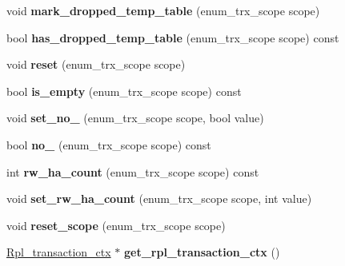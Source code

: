 \begin{DoxyCompactItemize}
\mbox{\label{classTransaction__ctx_aea4e08f7bcf5c692fd1ff96224eb10de}} 
void {\bfseries mark\+\_\+dropped\+\_\+temp\+\_\+table} (enum\+\_\+trx\+\_\+scope scope)
\item 
\mbox{\label{classTransaction__ctx_ad8d99dfe933f82d8cab74578e6116664}} 
bool {\bfseries has\+\_\+dropped\+\_\+temp\+\_\+table} (enum\+\_\+trx\+\_\+scope scope) const
\item 
\mbox{\label{classTransaction__ctx_a6dcc4e14c30441acb00bfe4e3ee8d58e}} 
void {\bfseries reset} (enum\+\_\+trx\+\_\+scope scope)
\item 
\mbox{\label{classTransaction__ctx_afa159d305acb12b115ec7c913e0c4211}} 
bool {\bfseries is\+\_\+empty} (enum\+\_\+trx\+\_\+scope scope) const
\item 
\mbox{\label{classTransaction__ctx_ad749bc2fe6f27acff04ec5912609898c}} 
void {\bfseries set\+\_\+no\+\_\+2pc} (enum\+\_\+trx\+\_\+scope scope, bool value)
\item 
\mbox{\label{classTransaction__ctx_a3aecf3a683f8290238181bbd18d8bf3d}} 
bool {\bfseries no\+\_\+2pc} (enum\+\_\+trx\+\_\+scope scope) const
\item 
\mbox{\label{classTransaction__ctx_a7a644bf071672433e0e0b7ccd285ae2a}} 
int {\bfseries rw\+\_\+ha\+\_\+count} (enum\+\_\+trx\+\_\+scope scope) const
\item 
\mbox{\label{classTransaction__ctx_a09626899f05fc5fa6b3d4b8aec44f27f}} 
void {\bfseries set\+\_\+rw\+\_\+ha\+\_\+count} (enum\+\_\+trx\+\_\+scope scope, int value)
\item 
\mbox{\label{classTransaction__ctx_ab15ed15fb4fdc9e5d09deb68c548d1fc}} 
void {\bfseries reset\+\_\+scope} (enum\+\_\+trx\+\_\+scope scope)
\item 
\mbox{\label{classTransaction__ctx_ad429c73b94803c43a1db097dfd0a7445}} 
\mbox{\hyperlink{classRpl__transaction__ctx}{Rpl\+\_\+transaction\+\_\+ctx}} $\ast$ {\bfseries get\+\_\+rpl\+\_\+transaction\+\_\+ctx} ()

\end{DoxyCompactItemize}
